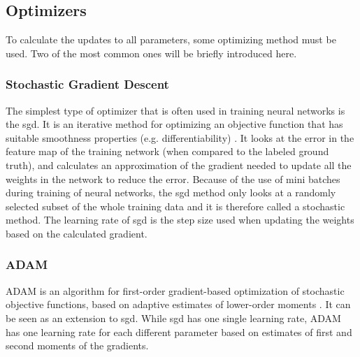 \subsection{Optimizers}
To calculate the updates to all parameters, some optimizing method must be used. Two of the most common ones will be briefly introduced here.

\subsubsection{Stochastic Gradient Descent}
The simplest type of optimizer that is often used in training neural networks is the \gls{sgd}. It is an iterative method for optimizing an objective function that has suitable smoothness properties (e.g. differentiability) \cite{stochasticgradientdescent}. It looks at the error in the feature map of the training network (when compared to the labeled ground truth), and calculates an approximation of the gradient needed to update all the weights in the network to reduce the error. Because of the use of mini batches during training of neural networks, the \gls{sgd} method only looks at a randomly selected subset of the whole training data and it is therefore called a stochastic method. The learning rate of \gls{sgd} is the step size used when updating the weights based on the calculated gradient.

\subsubsection{ADAM}
ADAM is an algorithm for first-order gradient-based optimization of stochastic objective functions, based on adaptive estimates of lower-order moments \cite{kingma2015adam}. It can be seen as an extension to \gls{sgd}. While \gls{sgd} has one single learning rate, ADAM has one learning rate for each different parameter based on estimates of first and second moments of the gradients. 